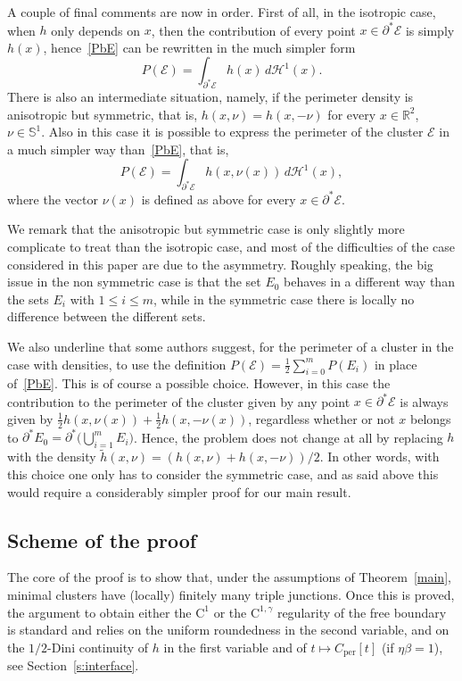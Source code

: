 \documentclass[10pt]{amsart}
\newcommand\R{\mathbb{R}}
\renewcommand\S{\mathbb{S}}
\newcommand\Ceeb{C_\mathrm{per}}
\newcommand\E{\mathcal{E}}
\renewcommand\H{\mathcal{H}}
\theoremstyle{plain}
\theoremstyle{definition}
\begin{document}
A couple of final comments are now in order. First of all, in the isotropic case, \ie when $h$ only depends on $x$, then the contribution of every point $x\in\partial^*\E$ is simply $h(x)$, hence~\eqref{PbE} can be rewritten in the much simpler form
\[
P(\E) = \int_{\partial^*\E} h(x)\, d\H^1(x).
\]
There is also an intermediate situation, namely, if the perimeter density is anisotropic but symmetric, that is, $h(x,\nu)=h(x,-\nu)$ for every $x\in\R^2$, $\nu\in\S^1$. Also in this case it is possible to express the perimeter of the cluster $\E$ in a much simpler way than~\eqref{PbE}, that is,
\[
P(\E) = \int_{\partial^*\E} h(x,\nu(x))\, d\H^1(x),
\]
where the vector $\nu(x)$ is defined as above for every $x\in\partial^*\E$.

We remark that the anisotropic but symmetric case is only slightly more complicate to treat than the isotropic case, and most of the difficulties of the case considered in this paper are due to the asymmetry. Roughly speaking, the big issue in the non symmetric case is that the set $E_0$ behaves in a different way than the sets $E_i$ with $1\leq i \leq m$, while in the symmetric case there is locally no difference between the different sets.

We also underline that some authors suggest, for the perimeter of a cluster in the case with densities, to use the definition $P(\E) = \frac 12 \sum_{i=0}^m P(E_i)$ in place of~\eqref{PbE}. This is of course a possible choice. However, in this case the contribution to the perimeter of the cluster given by any point $x\in\partial^*\E$ is always given by $\frac 12 h(x,\nu(x))+ \frac 12 h(x,-\nu(x))$, regardless whether or not $x$ belongs to $\partial^* E_0 = \partial^* \big(\bigcup_{i=1}^m E_i\big)$. Hence, the problem does not change at all by replacing $h$ with the density $\tilde h(x,\nu)=(h(x,\nu)+h(x,-\nu))/2$. In other words, with this choice one only has to consider the symmetric case, and as said above this would require a considerably simpler proof for our main result.\enlargethispage{.5\baselineskip}%

\subsection{Scheme of the proof\label{sec:exproof}}

The core of the proof is to show that, under the assumptions of Theorem~\ref{main}, minimal clusters have (locally) finitely many triple junctions.
Once this is proved, the argument to obtain either the $\mathrm{C}^1$ or the $\mathrm{C}^{1,\gamma}$ regularity of the free boundary is standard and relies on the uniform roundedness in the second variable, and on the $1/2$-Dini continuity of $h$ in the first variable and of $t\mapsto \Ceeb[t]$
(if $\eta\beta=1$), see Section~\ref{s:interface}.
\end{document}
